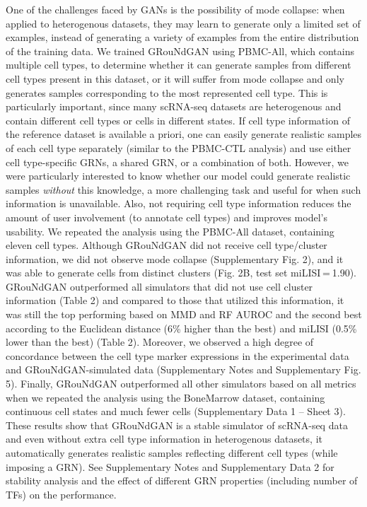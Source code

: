 One of the challenges faced by GANs is the possibility of mode collapse: when applied to heterogenous datasets, they may learn to generate only a limited set of examples, instead of generating a variety of examples from the entire distribution of the training data. We trained GRouNdGAN using PBMC-All, which contains multiple cell types, to determine whether it can generate samples from different cell types present in this dataset, or it will suffer from mode collapse and only generates samples corresponding to the most represented cell type. This is particularly important, since many scRNA-seq datasets are heterogenous and contain different cell types or cells in different states. If cell type information of the reference dataset is available a priori, one can easily generate realistic samples of each cell type separately (similar to the PBMC-CTL analysis) and use either cell type-specific GRNs, a shared GRN, or a combination of both. However, we were particularly interested to know whether our model could generate realistic samples \textit{without} this knowledge, a more challenging task and useful for when such information is unavailable. Also, not requiring cell type information reduces the amount of user involvement (to annotate cell types) and improves model’s usability. We repeated the analysis using the PBMC-All dataset, containing eleven cell types. Although GRouNdGAN did not receive cell type/cluster information, we did not observe mode collapse (Supplementary Fig. 2), and it was able to generate cells from distinct clusters (Fig. 2B, test set miLISI = 1.90). GRouNdGAN outperformed all simulators that did not use cell cluster information (Table 2) and compared to those that utilized this information, it was still the top performing based on MMD and RF AUROC and the second best according to the Euclidean distance (6\% higher than the best) and miLISI (0.5\% lower than the best) (Table 2). Moreover, we observed a high degree of concordance between the cell type marker expressions in the experimental data and GRouNdGAN-simulated data (Supplementary Notes and Supplementary Fig. 5). Finally, GRouNdGAN outperformed all other simulators based on all metrics when we repeated the analysis using the BoneMarrow dataset, containing continuous cell states and much fewer cells (Supplementary Data 1 – Sheet 3). These results show that GRouNdGAN is a stable simulator of scRNA-seq data and even without extra cell type information in heterogenous datasets, it automatically generates realistic samples reflecting different cell types (while imposing a GRN). See Supplementary Notes and Supplementary Data 2 for stability analysis and the effect of different GRN properties (including number of TFs) on the performance.

